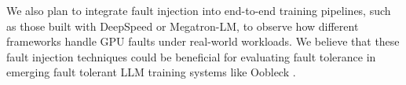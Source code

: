 We also plan to integrate fault injection into end-to-end training pipelines, such as those built with DeepSpeed or Megatron-LM, to observe how different frameworks handle GPU faults under real-world workloads. We believe that these fault injection techniques could be beneficial for evaluating fault tolerance in emerging fault tolerant LLM training systems like Oobleck \cite{oobleck}.
